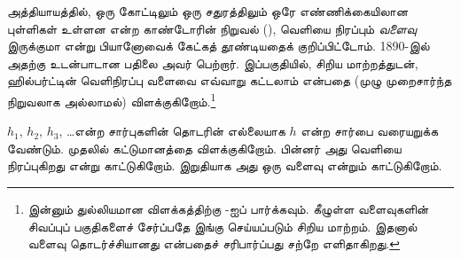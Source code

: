 \documentclass[../../../include/open-logic-section]{subfiles}
\begin{document}


 அத்தியாயத்தில், ஒரு கோட்டிலும்
ஒரு சதுரத்திலும் ஒரே எண்ணிக்கையிலான புள்ளிகள் உள்ளன என்ற
காண்டோரின் நிறுவல்
(),
வெளியை நிரப்பும் \emph{வளைவு} இருக்குமா என்று பியானோவைக்
கேட்கத் தூண்டியதைக் குறிப்பிட்டோம். 1890-இல் அதற்கு
உடன்பாடான பதிலை அவர் பெற்றார். இப்பகுதியில், சிறிய மாற்றத்துடன்,
ஹில்பர்ட்டின் வெளிநிரப்பு வளைவை எவ்வாறு கட்டலாம் என்பதை
(முழு முறைசார்ந்த நிறுவலாக அல்லாமல்) விளக்குகிறோம்.\footnote{இன்னும்
துல்லியமான விளக்கத்திற்கு \cite{Rose2010}-ஐப் பார்க்கவும்.
கீழுள்ள வளைவுகளின் சிவப்புப் பகுதிகளைச் சேர்ப்பதே இங்கு
செய்யப்படும் சிறிய மாற்றம். இதனால் வளைவு தொடர்ச்சியானது
என்பதைச் சரிபார்ப்பது சற்றே எளிதாகிறது.}

$h_1$, $h_2$, $h_3$, \dots\@ என்ற சார்புகளின் தொடரின்
எல்லையாக $h$ என்ற சார்பை வரையறுக்க வேண்டும். முதலில்
கட்டுமானத்தை விளக்குகிறோம். பின்னர் அது வெளியை நிரப்புகிறது
என்று காட்டுகிறோம். இறுதியாக அது ஒரு வளைவு என்றும்
காட்டுகிறோம்.
\end{document}
